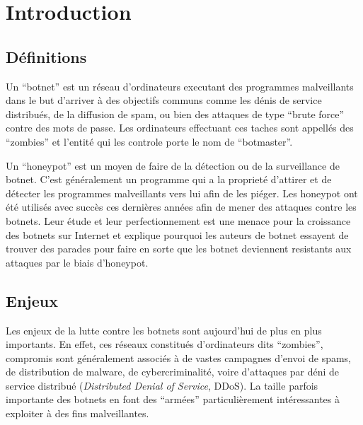 \section*{Introduction}

\subsection{Définitions}

Un ``botnet'' est un réseau d'ordinateurs executant des programmes malveillants
dans le but d'arriver à des objectifs communs comme les dénis de service distribués,
de la diffusion de spam, ou bien des attaques de type ``brute force'' contre
des mots de passe. Les ordinateurs effectuant ces taches sont appellés des ``zombies''
et l'entité qui les controle porte le nom de ``botmaster''.

Un ``honeypot'' est un moyen de faire de la détection ou de la
surveillance de botnet. C'est généralement un programme qui a la proprieté
d'attirer et de détecter les programmes malveillants vers lui afin de les piéger.
Les honeypot ont été utilisés avec succès ces dernières années afin
de mener des attaques contre les botnets. Leur étude et leur perfectionnement
est une menace pour la croissance des botnets sur Internet et explique
pourquoi les auteurs de botnet essayent de trouver des parades pour faire
en sorte que les botnet deviennent resistants aux attaques par le biais d'honeypot.

\subsection{Enjeux}

Les enjeux de la lutte contre les botnets sont aujourd'hui de plus en plus
importants. En effet, ces réseaux constitués d'ordinateurs dits ``zombies'',
compromis sont généralement associés
à de vastes campagnes d'envoi de spams, de distribution de malware, de
cybercriminalité, voire d'attaques par déni de service distribué
(\textit{Distributed Denial of Service}, DDoS).  La taille parfois importante
des botnets en font des ``armées'' particulièrement intéressantes à exploiter à
des fins malveil\-lantes.

